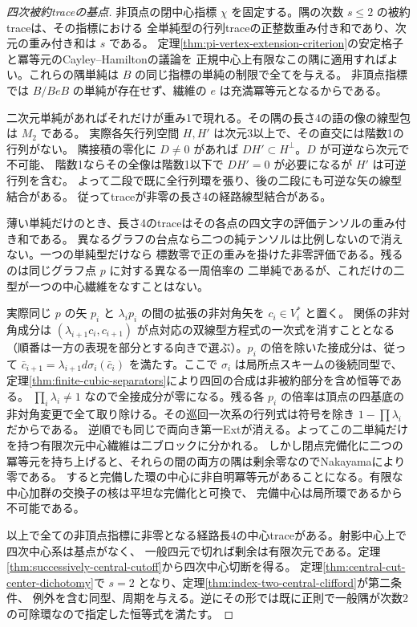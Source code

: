 \begin{proof}[四次被約traceの基点]
非頂点の閉中心指標 $\chi$ を固定する。隅の次数 $s\le2$ の被約traceは、その指標における
全単純型の行列traceの正整数重み付き和であり、次元の重み付き和は $s$ である。
定理\ref{thm:pi-vertex-extension-criterion}の安定格子と冪等元のCayley--Hamiltonの議論を
正規中心上有限なこの隅に適用すればよい。これらの隅単純は $B$ の同じ指標の単純の制限で全てを与える。
非頂点指標では $B/BeB$ の単純が存在せず、繊維の $e$ は充満冪等元となるからである。

二次元単純があればそれだけが重み1で現れる。その隅の長さ4の語の像の線型包は $M_2$ である。
実際各矢行列空間 $H,H'$ は次元3以上で、その直交には階数1の行列がない。
隣接積の零化に $D\ne0$ があれば $DH'\subset H^\perp$。$D$ が可逆なら次元で不可能、
階数1ならその全像は階数1以下で $DH'=0$ が必要になるが $H'$ は可逆行列を含む。
よって二段で既に全行列環を張り、後の二段にも可逆な矢の線型結合がある。
従ってtraceが非零の長さ4の経路線型結合がある。

薄い単純だけのとき、長さ4のtraceはその各点の四文字の評価テンソルの重み付き和である。
異なるグラフの台点なら二つの純テンソルは比例しないので消えない。一つの単純型だけなら
標数零で正の重みを掛けた非零評価である。残るのは同じグラフ点 $p$ に対する異なる一周倍率の
二単純であるが、これだけの二型が一つの中心繊維をなすことはない。

実際同じ $p$ の矢 $p_i$ と $\lambda_i p_i$ の間の拡張の非対角矢を $c_i\in V_i^*$ と置く。
関係の非対角成分は $(\lambda_{i+1}c_i,c_{i+1})$ が点対応の双線型方程式の一次式を消すこととなる
（順番は一方の表現を部分とする向きで選ぶ）。$p_i$ の倍を除いた接成分は、従って
$\bar c_{i+1}=\lambda_{i+1}d\sigma_i(\bar c_i)$ を満たす。ここで $\sigma_i$ は局所点スキームの後続同型で、
定理\ref{thm:finite-cubic-separators}により四回の合成は非被約部分を含め恒等である。
$\prod_i\lambda_i\ne1$ なので全接成分が零になる。残る各 $p_i$ の倍率は頂点の四基底の
非対角変更で全て取り除ける。その巡回一次系の行列式は符号を除き $1-\prod\lambda_i$ だからである。
逆順でも同じで両向き第一Extが消える。よってこの二単純だけを持つ有限次元中心繊維は二ブロックに分かれる。
しかし閉点完備化に二つの冪等元を持ち上げると、それらの間の両方の隅は剰余零なのでNakayamaにより零である。
すると完備した環の中心に非自明冪等元があることになる。有限な中心加群の交換子の核は平坦な完備化と可換で、
完備中心は局所環であるから不可能である。

以上で全ての非頂点指標に非零となる経路長4の中心traceがある。射影中心上で四次中心系は基点がなく、
一般四元で切れば剰余は有限次元である。定理\ref{thm:successively-central-cutoff}から四次中心切断を得る。
定理\ref{thm:central-cut-center-dichotomy}で $s=2$ となり、定理\ref{thm:index-two-central-clifford}が第二条件、
例外を含む同型、周期を与える。逆にその形では既に正則で一般隅が次数2の可除環なので指定した恒等式を満たす。
\end{proof}


